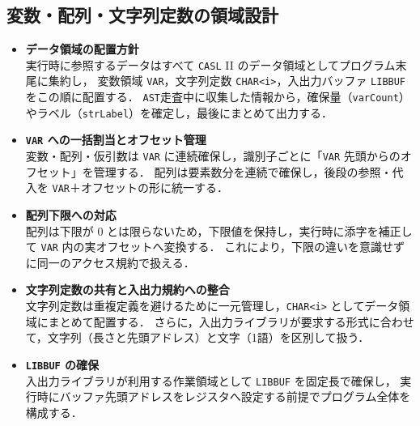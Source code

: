 \documentclass[a4j,10pt]{jarticle}
\begin{document}
\subsection{変数・配列・文字列定数の領域設計}
\begin{itemize}
  \item \textbf{データ領域の配置方針}\\
  実行時に参照するデータはすべて \verb|CASL| II のデータ領域としてプログラム末尾に集約し，
  変数領域 \texttt{VAR}，文字列定数 \texttt{CHAR<i>}，入出力バッファ \texttt{LIBBUF} をこの順に配置する．
  \verb|AST|走査中に収集した情報から，確保量（\verb|varCount|）やラベル（\verb|strLabel|）を確定し，最後にまとめて出力する．

  \item \textbf{\texttt{VAR} への一括割当とオフセット管理}\\
  変数・配列・仮引数は \texttt{VAR} に連続確保し，識別子ごとに「\texttt{VAR} 先頭からのオフセット」を管理する．
  配列は要素数分を連続で確保し，後段の参照・代入を \texttt{VAR}＋オフセットの形に統一する．

  \item \textbf{配列下限への対応}\\
  配列は下限が 0 とは限らないため，下限値を保持し，実行時に添字を補正して \texttt{VAR} 内の実オフセットへ変換する．
  これにより，下限の違いを意識せずに同一のアクセス規約で扱える．

  \item \textbf{文字列定数の共有と入出力規約への整合}\\
  文字列定数は重複定義を避けるために一元管理し，\texttt{CHAR<i>} としてデータ領域にまとめて配置する．
  さらに，入出力ライブラリが要求する形式に合わせて，文字列（長さと先頭アドレス）と文字（1語）を区別して扱う．

  \item \textbf{\texttt{LIBBUF} の確保}\\
  入出力ライブラリが利用する作業領域として \texttt{LIBBUF} を固定長で確保し，
  実行時にバッファ先頭アドレスをレジスタへ設定する前提でプログラム全体を構成する．
\end{itemize}
\end{document}
